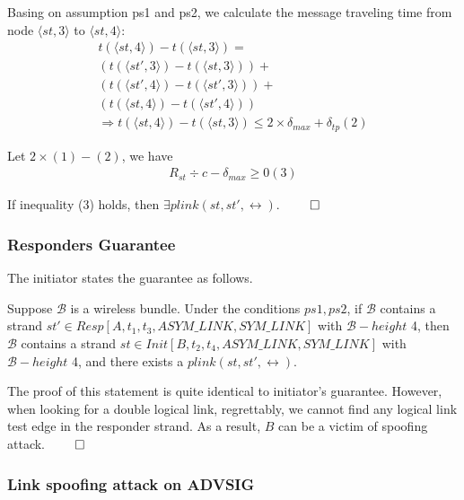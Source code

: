 Basing on assumption ps1 and ps2, we calculate the message traveling time from node $\langle st, 3 \rangle$ to $\langle st, 4 \rangle$:
\begin{equation*}
\label{equation1}
\begin{split}
t(\langle st,4\rangle) - t(\langle st, 3 \rangle) = \\
(t(\langle st', 3 \rangle) - t(\langle st, 3 \rangle)) + \\
(t(\langle st', 4 \rangle) - t(\langle st', 3 \rangle)) + \\
(t(\langle st, 4 \rangle) - t(\langle st', 4 \rangle)) \\
\Rightarrow t(\langle st,4\rangle) - t(\langle st, 3 \rangle) \le 2 \times \delta_{max} + \delta_{tp} (2)
\end{split}
\end{equation*}

 Let $2\times(1) - (2)$, we have
\begin{equation*}
\label{equation2}
\begin{split}
	R_{st} \div c - \delta_{max} \ge 0 (3)
\end{split}
\end{equation*}

If inequality (3) holds, then $\exists plink(st,st', \leftrightarrow)$. $\qed$
  
\subsubsection*{Responders Guarantee}

The initiator states the guarantee as follows.

Suppose $\mathcal{B}$ is a wireless bundle. Under the conditions $ps1, ps2$, if $\mathcal{B}$ contains a strand $st' \in Resp[A,t_1,t_3,ASYM\_LINK, SYM\_LINK]$ with $\mathcal{B} -height$ 4, then $\mathcal{B}$ contains a strand $st \in Init[B,t_2,t_4,ASYM\_LINK, SYM\_LINK]$ with $\mathcal{B} -height$ 4, and there exists a $plink(st,st',\leftrightarrow)$. 

The proof of this statement is quite identical to initiator's guarantee. However, when looking for a double logical link, regrettably, we cannot find any logical link test edge in the responder strand. As a result, $B$ can be a victim of spoofing attack. $\qed$ 
 
\subsubsection*{Link spoofing attack on ADVSIG} 

